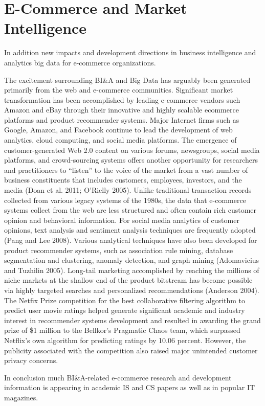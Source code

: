 \section{E-Commerce and Market Intelligence}
In addition new impacts and development directions in business intelligence and analytics big data for e-commerce organizations.

The excitement surrounding BI\&A and Big Data has arguably
been generated primarily from the web and e-commerce
communities. Significant market transformation has been
accomplished by leading e-commerce vendors such Amazon
and eBay through their innovative and highly scalable ecommerce
platforms and product recommender systems.
Major Internet firms such as Google, Amazon, and Facebook
continue to lead the development of web analytics, cloud
computing, and social media platforms. The emergence of
customer-generated Web 2.0 content on various forums,
newsgroups, social media platforms, and crowd-sourcing
systems offers another opportunity for researchers and practitioners to “listen” to the voice of the market from a vast
number of business constituents that includes customers, employees,
investors, and the media (Doan et al. 2011; O’Rielly
2005). Unlike traditional transaction records collected from
various legacy systems of the 1980s, the data that e-commerce
systems collect from the web are less structured and often
contain rich customer opinion and behavioral information.
For social media analytics of customer opinions, text analysis
and sentiment analysis techniques are frequently adopted
(Pang and Lee 2008). Various analytical techniques have also
been developed for product recommender systems, such as
association rule mining, database segmentation and clustering,
anomaly detection, and graph mining (Adomavicius and
Tuzhilin 2005). Long-tail marketing accomplished by
reaching the millions of niche markets at the shallow end of
the product bitstream has become possible via highly targeted
searches and personalized recommendations (Anderson
2004).
The Netfix Prize competition for the best collaborative
filtering algorithm to predict user movie ratings helped generate
significant academic and industry interest in recommender
systems development and resulted in awarding the grand prize
of \$1 million to the Bellkor’s Pragmatic Chaos team, which
surpassed Netflix’s own algorithm for predicting ratings by
10.06 percent. However, the publicity associated with the
competition also raised major unintended customer privacy
concerns.

In conclusion much BI\&A-related e-commerce research and development
information is appearing in academic IS and CS papers as
well as in popular IT magazines.